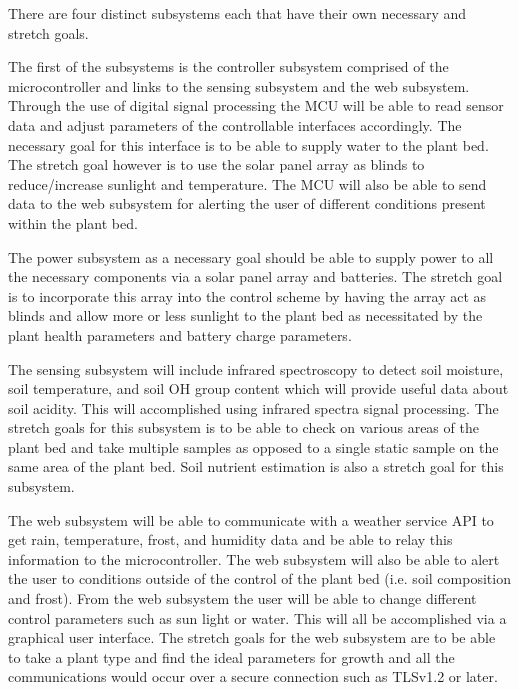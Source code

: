There are four distinct subsystems each that have their own necessary and stretch goals.

The first of the subsystems is the controller subsystem comprised of the microcontroller and links to the sensing subsystem and the web subsystem. Through the use of digital signal processing the MCU will be able to read sensor data and adjust parameters of the controllable interfaces accordingly. The necessary goal for this interface is to be able to supply water to the plant bed. The stretch goal however is to use the solar panel array as blinds to reduce/increase sunlight and temperature. The MCU will also be able to send data to the web subsystem for alerting the user of different conditions present within the plant bed.

The power subsystem as a necessary goal should be able to supply power to all the necessary components via a solar panel array and batteries. The stretch goal is to incorporate this array into the control scheme by having the array act as blinds and allow more or less sunlight to the plant bed as necessitated by the plant health parameters and battery charge parameters.

The sensing subsystem will include infrared spectroscopy to detect soil moisture, soil temperature, and soil OH group content which will provide useful data about soil acidity. This will accomplished using infrared spectra signal processing. The stretch goals for this subsystem is to be able to check on various areas of the plant bed and take multiple samples as opposed to a single static sample on the same area of the plant bed. Soil nutrient estimation is also a stretch goal for this subsystem.

The web subsystem will be able to communicate with a weather service API to get rain, temperature, frost, and humidity data and be able to relay this information to the microcontroller. The web subsystem will also be able to alert the user to conditions outside of the control of the plant bed (i.e. soil composition and frost). From the web subsystem the user will be able to change different control parameters such as sun light or water. This will all be accomplished via a graphical user interface. The stretch goals for the web subsystem are to be able to take a plant type and find the ideal parameters for growth and all the communications would occur over a secure connection such as TLSv1.2 or later.
